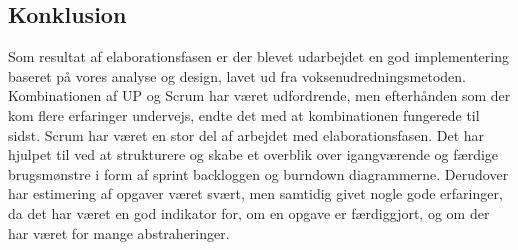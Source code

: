 \documentclass[../main.tex]{subfiles}
\begin{document}
\subsection{Konklusion}
Som resultat af elaborationsfasen er der blevet udarbejdet en god implementering baseret på vores analyse og design, lavet ud fra voksenudredningsmetoden. Kombinationen af UP og Scrum har været udfordrende, men efterhånden som der kom flere erfaringer undervejs, endte det med at kombinationen fungerede til sidst. Scrum har været en stor del af arbejdet med elaborationsfasen. Det har hjulpet til ved at strukturere og skabe et overblik over igangværende og færdige brugsmønstre i form af sprint backloggen og burndown diagrammerne. Derudover har estimering af opgaver været svært, men samtidig givet nogle gode erfaringer, da det har været en god indikator for, om en opgave er færdiggjort, og om der har været for mange abstraheringer.
\end{document}

